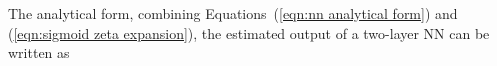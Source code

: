The analytical form, combining Equations~(\ref{eqn:nn analytical form}) and (\ref{eqn:sigmoid zeta expansion}), the estimated output of a two-layer NN can be written as
